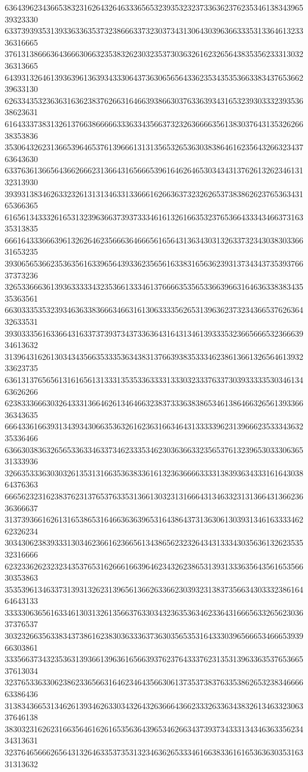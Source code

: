 63643962343665383231626432646333656532393532323733636237623534613834396539323330
63373939353139336336353732386663373230373431306430396366333531336461323336316665
37613138666364366630663235383262303235373036326162326564383535623331303236313665
64393132646139363961363934333064373630656564336235343535366338343765366239633130
62633435323636316362383762663164663938663037633639343165323930333239353638623631
61643337383132613766386666633363343566373232636666356138303764313532626638353836
35306432623136653964653761396661313135653265363038386461623564326632343763643630
63376361366564366266623136643165666539616462646530343431376261326234613132313930
39393138346263323261313134633133666162663637323262653738386262376536343165366365
61656134333261653132396366373937333461613261663532376536643334346637316335313835
66616433366639613262646235666364666561656431363430313263373234303830336631653235
39306565366235363561633965643933623565616338316563623931373434373539376637373236
32653366636139363333343235366133346137666635356533663966316463633838343535363561
66303335353239346363383666346631613063333562653139636237323436653762636432633531
39303335616336643163373739373437336364316431346139333532366566653236663934613632
31396431626130343435663533353634383137663938353334623861366132656461393233623735
63613137656561316165613133313535336333313330323337633730393333353034613463626266
62383336663032643331366462613464663238373336383865346138646632656139336636343635
66643361663931343934306635363261623631663464313333396231396662353334363235336466
63663038363265653363346337346233353462303636633235653761323965303330636531333936
32663533363030326135313166353638336161323636666333313839363433316164303864376363
66656232316238376231376537633531366130323131666431346332313136643136623636366637
31373936616261316538653164663636396531643864373136306130393134616333346262326234
30343062383933313034623661623665613438656232326434313334303563613262353532316666
62323362623232343537653162666166396462343262386531393133363564356165356630353863
35353961346337313931326231396561366263366230393231383735663430333238616464643133
33333063656163346130313261356637633034323635363462336431666563326562303637376537
30323266356338343738616238303633363736303565353164333039656665346665393966303861
33356637343235363139366139636165663937623764333762313531396336353765366537613034
32376533633062386233656631646234643566306137353738376335386265323834666663386436
31383436653134626139346263303432643263666436623332633634383261346332306337646138
38303231626231663564616261653563643965346266343739373433313434636335623434313631
32376465666265643132646335373531323463626533346166383361616536363035316331313632
